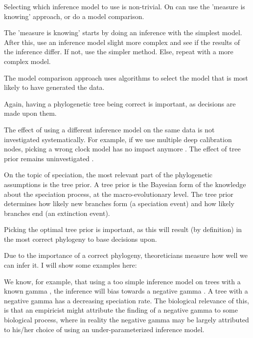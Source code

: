 Selecting which inference model to use is non-trivial.
On can use the 'measure is knowing' approach, or do a model comparison.

The 'measure is knowing' starts by doing an inference with the simplest model.
After this, use an inference model slight more complex and see if the results
of the inference differ. If not, use the simpler method. Else, repeat with
a more complex model.

The model comparison approach uses algorithms to select the model that is
most likely to have generated the data. 

Again, having a phylogenetic tree being correct is important,
as decisions are made upon them. 

The effect of using a different inference model on the same data
is not investigated systematically. For example, 
if we use multiple deep calibration nodes, picking a
wrong clock model has no impact anymore \cite{duchene2014impact}.
The effect of tree prior remains uninvestigated \cite{alfaro2006posterior}.

%
%

On the topic of speciation, the most relevant part of the phylogenetic
assumptions is the tree prior. A tree prior is the Bayesian
form of the knowledge about the speciation process, at the
macro-evolutionary level. The tree prior determines how likely
new branches form (a speciation event) and how likely branches end (an
extinction event).

Picking the optimal tree prior is important, as this will result (by 
definition) in the most correct phylogeny to base decisions upon.

Due to the importance of a correct phylogeny, theoreticians
measure how well we can infer it. I will show some examples here:

%
%
%

We know, for example, that using a too simple inference model
on trees with a known gamma \cite{pybus2000testing}, the inference will bias
towards a negative gamma \cite{revell2005under}. A tree with
a negative gamma has a decreasing speciation rate. 
The biological relevance of this, is that an empiricist might
attribute the finding of a negative gamma to some biological
process, where in reality the negative gamma may be largely
attributed to his/her choice of using an under-parameterized inference
model.

